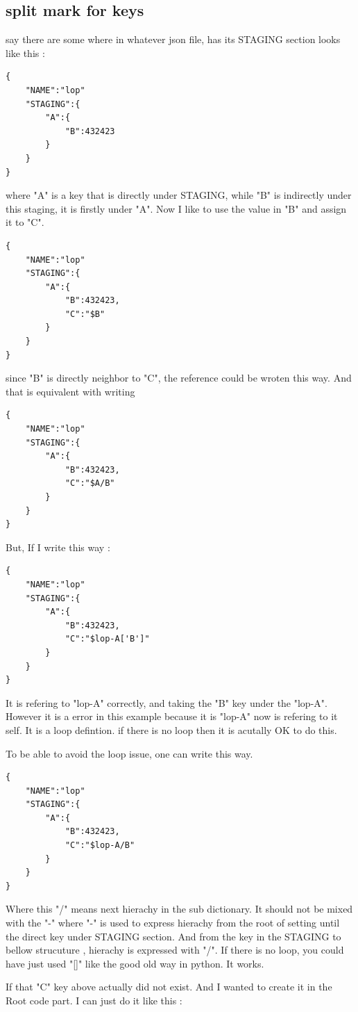 \documentclass{article}
\begin{document}
\subsection{split mark for keys}
say there are some where in whatever json file, has its STAGING section looks like this : 
\begin{lstlisting}
{
	"NAME":"lop"
	"STAGING":{
		"A":{
			"B":432423
		}
	}
}
\end{lstlisting}
where "A" is a key that is directly under STAGING,
while "B" is indirectly under this staging, it is firstly under "A".
Now I like to use the value in "B" and assign it to "C".
\begin{lstlisting}
{
	"NAME":"lop"
	"STAGING":{
		"A":{
			"B":432423,
			"C":"$B"
		}
	}
}
\end{lstlisting}
since "B" is directly neighbor to "C", the reference could be wroten this way. And that is equivalent with writing
\begin{lstlisting}
{
	"NAME":"lop"
	"STAGING":{
		"A":{
			"B":432423,
			"C":"$A/B"
		}
	}
}
\end{lstlisting}

But, If I write this way : 
\begin{lstlisting}
{
	"NAME":"lop"
	"STAGING":{
		"A":{
			"B":432423,
			"C":"$lop-A['B']"
		}
	}
}

\end{lstlisting}

It is refering to "lop-A" correctly, and taking the "B"
key under the "lop-A". However it is a error in this example
because it is "lop-A" now is refering to it self. It is a loop
defintion. if there is no loop then it is acutally OK to do this.

To be able to avoid the loop issue, one can write this way.
\begin{lstlisting}
{
	"NAME":"lop"
	"STAGING":{
		"A":{
			"B":432423,
			"C":"$lop-A/B"
		}
	}
}
\end{lstlisting}
Where this "/" means next hierachy in the sub dictionary.
It should not be mixed with the "-" where "-" is
used to express hierachy from the root of setting until the direct key under STAGING section. And from the key in the STAGING to bellow strucuture , hierachy is expressed with "/". If there is no loop, you could have just used "[]" like the good old way in python. It works.


If that "C" key above actually did not exist.
And I wanted to create it in the Root code part.
I can just do it like this : 
\end{document}
